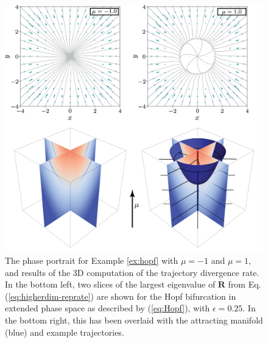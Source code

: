 \documentclass[twocolumn]{svjour3}
\begin{document}
\begin{figure}
	\centering
	\includegraphics[width=0.85\linewidth]{div-rate-3d-figure.png}
	\caption{The phase portrait for Example \ref{ex:hopf} with $\mu=-1$ and $\mu=1$, and results of the 3D computation of the trajectory divergence rate. In the bottom left, two slices of the largest eigenvalue of $\dot{\mathbf{R}}$ from Eq. (\ref{eq:higherdim-reprate}) are shown for the Hopf bifurcation in extended phase space as described by (\ref{eq:Hopf}), with $\epsilon=0.25$. In the bottom right, this has been overlaid with the attracting manifold (blue) and example trajectories.}
	\label{fig:Hopf}
\end{figure}
\end{document}
